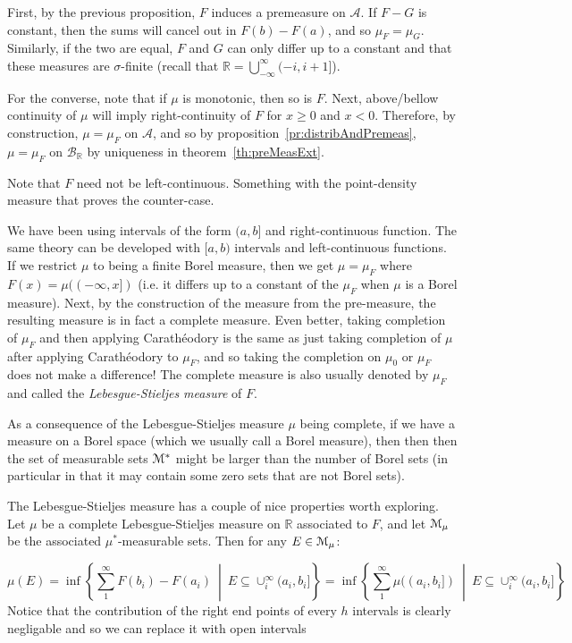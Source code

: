 \documentclass[oneside]{book}
\newcommand{\R}{\mathbb{R}}
\newcommand{\CA}{\mathcal{A}}
\newcommand{\MM}{\EuScript{M}}
\newcommand{\BB}{\mathcal{B}}
\newcommand{\sse}{\subseteq}
\newcommand{\set}[2]{\left\{#1 \ \middle|\ #2\right\}}
\begin{document}
\begin{Proof}
	First, by the previous proposition, $F$ induces a premeasure on $\CA$. If $F-G$ is constant, then the sums will
	cancel out in $F(b) - F(a)$, and so $\mu_F = \mu_G$. Similarly, if the two are equal, $F$ and $G$ can only differ up
	to a constant and that these measures are $\sigma$-finite (recall that $\R = \bigcup_{-\infty}^\infty (-i, i+1]$). 

	For the converse, note that if $\mu$ is monotonic, then so is $F$. Next, above/bellow continuity of $\mu$ will imply
	right-continuity of $F$ for $x \ge 0$ and $x < 0$. Therefore, by construction, $\mu = \mu_F$ on $\CA$, and so by
	proposition~\ref{pr:distribAndPremeas}, $\mu=  \mu_F$ on $\BB_\R$ by uniqueness in theorem~\ref{th:preMeasExt}.
\end{Proof}

Note that $F$ need not be left-continuous. Something with the point-density measure that proves the counter-case.

We have been using intervals of the form $(a, b]$ and right-continuous function. The same theory can be developed with
$[a, b)$ intervals and left-continuous functions. If we restrict $\mu$ to being a finite Borel measure, then we get $\mu
= \mu_F$ where $F(x) = \mu((-\infty, x])$ (i.e. it differs up to a constant of the $\mu_F$ when $\mu$ is a Borel
measure). Next, by the construction of the measure from the pre-measure, the resulting measure is in fact a complete
measure. Even better, taking completion of $\mu_F$ and then applying Carath\'eodory is the same as just taking
completion of $\mu$ after applying Carath\'eodory to $\mu_F$, and so taking the completion on
$\mu_0$ or $\mu_F$ does not make a difference! The complete measure is also usually denoted by $\mu_F$ and called the \emph{Lebesgue-Stieljes measure} of
$F$.

As a consequence of the Lebesgue-Stieljes measure $\mu$ being complete, if we have a measure on a Borel space (which we
usually call a Borel measure), then then then the set of measurable sets $\MM^*$ might be larger than the number of
Borel sets (in particular in that it may contain some zero sets that are not Borel sets).

The Lebesgue-Stieljes measure has a couple of nice properties worth exploring. Let $\mu$ be a complete Lebesgue-Stieljes
measure on $\R$ associated to $F$, and let $\MM_\mu$ be the associated $\mu^*$-measurable sets. Then for any $E \in
\MM_\mu$:

\[
	\mu(E) = \inf \set{\sum_1^\infty F(b_i) - F(a_i)}{E \sse \cup_i^\infty (a_i, b_i]} = \inf \set{\sum_1^\infty \mu((a_i, b_i])}{E \sse \cup_i^\infty (a_i, b_i]}
\]
Notice that the contribution of the right end points of every $h$ intervals is clearly negligable and so we can replace
it with open intervals
\end{document}
